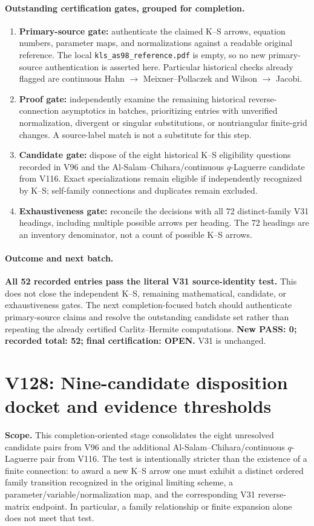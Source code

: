 \documentclass[11pt]{article}
\begin{document}
\paragraph{Outstanding certification gates, grouped for completion.}
\begin{enumerate}
\item \textbf{Primary-source gate:} authenticate the claimed K--S arrows, equation numbers, parameter maps, and normalizations against a readable original reference. The local \texttt{kls\_as98\_reference.pdf} is empty, so no new primary-source authentication is asserted here. Particular historical checks already flagged are continuous Hahn $\to$ Meixner--Pollaczek and Wilson $\to$ Jacobi.
\item \textbf{Proof gate:} independently examine the remaining historical reverse-connection asymptotics in batches, prioritizing entries with unverified normalization, divergent or singular substitutions, or nontriangular finite-grid changes. A source-label match is not a substitute for this step.
\item \textbf{Candidate gate:} dispose of the eight historical K--S eligibility questions recorded in V96 and the Al-Salam--Chihara/continuous $q$-Laguerre candidate from V116. Exact specializations remain eligible if independently recognized by K--S; self-family connections and duplicates remain excluded.
\item \textbf{Exhaustiveness gate:} reconcile the decisions with all 72 distinct-family V31 headings, including multiple possible arrows per heading. The 72 headings are an inventory denominator, not a count of possible K--S arrows.
\end{enumerate}
\paragraph{Outcome and next batch.} \textbf{All 52 recorded entries pass the literal V31 source-identity test.} This does not close the independent K--S, remaining mathematical, candidate, or exhaustiveness gates. The next completion-focused batch should authenticate primary-source claims and resolve the outstanding candidate set rather than repeating the already certified Carlitz--Hermite computations. \textbf{New PASS: 0; recorded total: 52; final certification: OPEN.} V31 is unchanged.


\clearpage
\section{V128: Nine-candidate disposition docket and evidence thresholds}
\noindent\textbf{Scope.} This completion-oriented stage consolidates the eight unresolved candidate pairs from V96 and the additional Al-Salam--Chihara/continuous $q$-Laguerre pair from V116. The test is intentionally stricter than the existence of a finite connection: to award a new K--S arrow one must exhibit a distinct ordered family transition recognized in the original limiting scheme, a parameter/variable/normalization map, and the corresponding V31 reverse-matrix endpoint. In particular, a family relationship or finite expansion alone does not meet that test.
\end{document}
